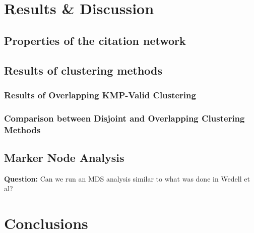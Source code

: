 \documentclass{article}
\begin{document}
\section{Results \& Discussion}

\subsection{Properties of the citation network}

\subsection{Results of clustering methods}

\subsubsection{Results of Overlapping KMP-Valid Clustering}

\subsubsection{Comparison between Disjoint and Overlapping Clustering Methods}

\subsection{Marker Node Analysis}

\textbf{Question:} Can we run an MDS analysis similar to what was done in Wedell et al?


\section{Conclusions}
\end{document}
